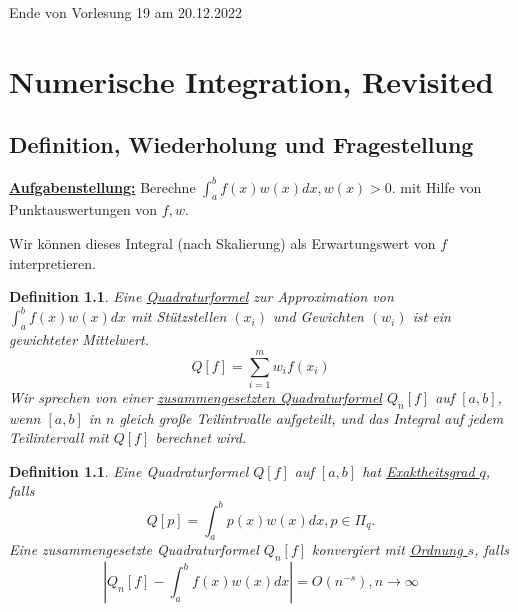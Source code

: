 \documentclass{book}
\newtheorem{definition}[algorithm]{Definition}
\begin{document}


            \noindent
            \xrfill[0.7ex]{1pt}Ende von Vorlesung 19 am 20.12.2022\xrfill[0.7ex]{1pt}
            
    \chapter{Numerische Integration, Revisited}                

        \section{Definition, Wiederholung und Fragestellung}

            \underline{\textbf{Aufgabenstellung:}} Berechne $\int_a^bf(x)w(x)dx, w(x)>0$. mit Hilfe 
            von Punktauswertungen von $f,w$.

            \begin{tcolorbox}[enhanced,breakable,
            title=Motivation]
            Wir können dieses Integral (nach Skalierung) als Erwartungswert von $f$ interpretieren.
            \end{tcolorbox}
            
            \begin{definition}\label{d51}
                Eine \underline{Quadraturformel} zur Approximation von $\int_a^b f(x)w(x)dx$ mit 
                Stützstellen $(x_i)$ und Gewichten $(w_i)$ ist ein gewichteter Mittelwert.
                \begin{equation}
                    Q[f]=\sum_{i=1}^mw_if(x_i)\label{g51}
                \end{equation}
                Wir sprechen von einer \underline{zusammengesetzten Quadraturformel} $Q_n[f]$ auf $[a,b]$, wenn 
                $[a,b]$ in $n$ gleich große Teilintrvalle aufgeteilt, und das Integral auf jedem Teilintervall mit $Q[f]$ berechnet wird.
            \end{definition}

            \begin{definition}\label{d52}
                Eine Quadraturformel $Q[f]$ auf $[a,b]$ hat \underline{Exaktheitsgrad $q$}, falls 
                \begin{equation*}
                    Q[p]=\int_a^b p(x)w(x)dx,p\in\Pi_q.
                \end{equation*}
                Eine zusammengesetzte Quadraturformel $Q_n[f]$ konvergiert mit \underline{Ordnung $s$}, falls 
                \begin{equation*}
                    \left\vert Q_n[f]-\int_a^b f(x)w(x)dx \right\vert = O(n^{-s}),n\to\infty
                \end{equation*}
            \end{definition}
\end{document}
